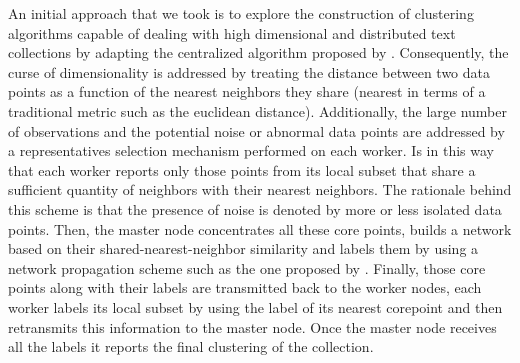 \documentclass[10pt]{article}
\begin{document}
An initial approach that we took is to explore the construction of clustering algorithms capable of dealing with high dimensional and distributed text collections by adapting the centralized algorithm proposed by \cite{ESK03}.
Consequently, the curse of dimensionality is addressed by treating the distance between two data points as a function of the nearest neighbors they share (nearest in terms of a traditional metric such as the euclidean distance).
Additionally, the large number of observations and the potential noise or abnormal data points are addressed by a representatives selection mechanism performed on each worker.
Is in this way that each worker reports only those points from its local subset that share a sufficient quantity of neighbors with their nearest neighbors. 
The rationale behind this scheme is that the presence of noise is denoted by more or less isolated data points.
Then, the master node concentrates all these core points, builds a network based on their shared-nearest-neighbor similarity and labels them by using a network propagation scheme such as the one proposed by \cite{RAK07}.
Finally, those core points along with their labels are transmitted back to the worker nodes, each worker labels its local subset by using the label of its nearest corepoint and then retransmits this information to the master node. Once the master node receives all the labels it reports the final clustering of the collection.


\end{document}

